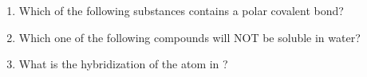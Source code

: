 \documentclass[main.tex]{subfiles}
\begin{document}
\begin{fullwidth}
\begin{multicols}{2}\begin{enumerate}[resume]  \setlength\itemsep{0.2em}
    \setcounter{enumi}{\theenumTempD}





\item Which of the following substances contains a polar covalent bond?
\begin{enumerate}[label=(\alph*)]\vspace{-0.5cm}
\end{enumerate}\vspace{-0.5cm}

\item Which one of the following compounds will NOT be soluble in water?
\begin{enumerate}[label=(\alph*)]\vspace{-0.5cm}
\end{enumerate}\vspace{-0.5cm}

\item What is the hybridization of the   atom in  ?
\begin{enumerate}[label=(\alph*)]\vspace{-0.5cm}
\end{enumerate}\vspace{-0.5cm}


\end{enumerate}
\end{multicols}
\end{fullwidth}
\end{document}
